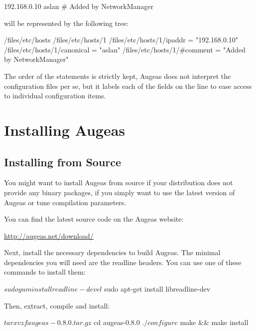 \begin{bash}
192.168.0.10    aslan   # Added by NetworkManager
\end{bash}

will be represented by the following tree:

\begin{augtoolsh}
/files/etc/hosts
/files/etc/hosts/1
/files/etc/hosts/1/ipaddr = "192.168.0.10"
/files/etc/hosts/1/canonical = "aslan"
/files/etc/hosts/1/#comment = "Added by NetworkManager"
\end{augtoolsh}

The order of the statements is strictly kept, Augeas does not interpret the configuration files per se, but it labels each of the fields on the line to ease access to individual configuration items.

\section{Installing Augeas}

\label{sec:installing_augeas} 

\subsection{Installing from Source}


You might want to install Augeas from source if your distribution does not provide any binary packages, if you simply want to use the latest version of Augeas or tune compilation parameters.

You can find the latest source code on the Augeas website:

	\url{http://augeas.net/download/}

Next, install the necessary dependencies to build Augeas. The minimal dependencies you will need are the readline headers. You can use one of these commands to install them:

\begin{console}
$ sudo yum install readline-devel
$ sudo apt-get install libreadline-dev
\end{console}

Then, extract, compile and install:

\begin{console}
$ tar xvzf augeas-0.8.0.tar.gz
$ cd augeas-0.8.0
$ ./configure
$ make && make install
\end{console}

